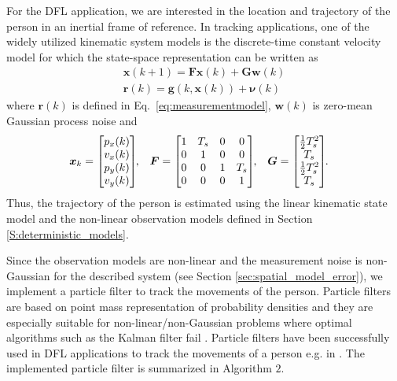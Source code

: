 \documentclass[journal, 10pt, twocolumn, balance]{IEEEtran}
\begin{document}
For the DFL application, we are interested in the location and trajectory of the person in an inertial frame of reference. In tracking applications, one of the widely utilized kinematic system models is the discrete-time constant velocity model \cite[Ch. 6]{BarShalom2001} for which the state-space representation can be written as
\begin{subequations} \label{eq:state_model}
\begin{align}
	\bm{x}(k+1) = \bm{F} \bm{x}(k) + \bm{G} \bm{w}(k) \\
	\bm{r}(k) = \bm{g}(k,\bm{x}(k)) + \bm{\nu}(k)
\end{align}
\end{subequations}
where $\bm{r}(k)$ is defined in Eq.~\eqref{eq:measurementmodel}, $\bm{w}(k)$ is zero-mean Gaussian process noise and 
$$
\bm{x}_k = \left[\begin{matrix} p_x(k) \\ v_x(k) \\ p_y(k) \\ v_y(k) \end{matrix}\right] \negthickspace\text{,}\quad
\bm{F} = \left[\begin{matrix} 1&T_s&0&0 \\ 0&1&0&0 \\ 0&0&1&T_s \\ 0&0&0&1 \end{matrix}\right] \negthickspace\text{,}\quad
\bm{G} = \left[\begin{matrix} \frac{1}{2}T_s^2 \\ T_s \\ \frac{1}{2}T_s^2 \\ T_s\end{matrix}\right] \negthickspace\text{.}\quad
$$
Thus, the trajectory of the person is estimated using the linear kinematic state model and the non-linear observation models defined in Section \ref{S:deterministic_models}.


Since the observation models are non-linear and the measurement noise is non-Gaussian for the described system (see Section \ref{sec:spatial_model_error}), we implement a particle filter to track the movements of the person. Particle filters are based on point mass representation of probability densities and they are especially suitable for non-linear/non-Gaussian problems where optimal algorithms such as the Kalman filter fail \cite{Arulampalam2002}. Particle filters have been successfully used in DFL applications to track the movements of a person e.g. in \cite{Wilson2012,Zheng2012,li2011,Guo2013}. The implemented particle filter is summarized in Algorithm $2$.
\end{document}
